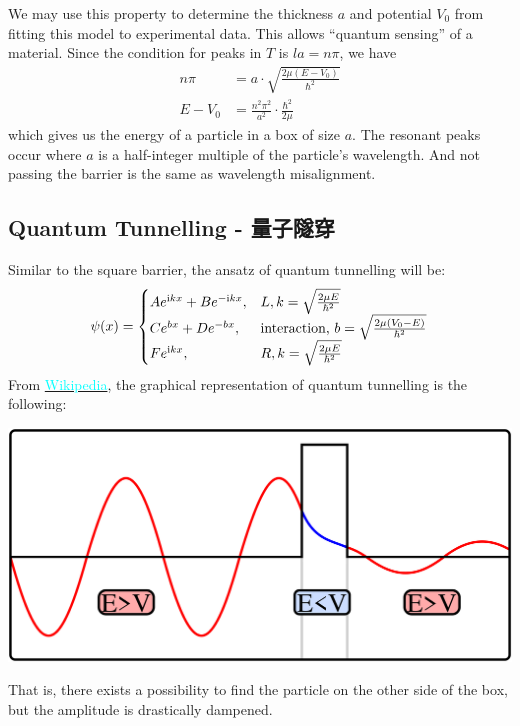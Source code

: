 We may use this property to determine the thickness $a$ and potential $V_0$ from fitting this model to experimental data. This allows ``quantum sensing'' of a material. Since the condition for peaks in $T$ is $la = n\pi$, we have
\begin{align*}
    n\pi &= a \cdot \sqrt{\frac{2\mu(E - V_0)}{\hbar^2}} \\
    E - V_0 &= \frac{n^2 \pi^2}{a^2} \cdot \frac{\hbar^2}{2\mu}
\end{align*}
which gives us the energy of a particle in a box of size $a$. The resonant peaks occur where $a$ is a half-integer multiple of the particle's wavelength. And not passing the barrier is the same as wavelength misalignment.

\subsection{Quantum Tunnelling - 量子隧穿}
Similar to the square barrier, the ansatz of quantum tunnelling will be:
$$\psi(x) = \begin{cases}
    Ae^{\mathrm{i} k x} + Be^{-\mathrm{i} k x}, & L, k = \sqrt{\frac{2\mu E}{\hbar^2}} \\
    Ce^{b x} + De^{-b x}, & \text{interaction, } b = \sqrt{\frac{2\mu(V_0 - E)}{\hbar^2}} \\
    Fe^{\mathrm{i} k x}, & R, k = \sqrt{\frac{2\mu E}{\hbar^2}}
\end{cases}$$
From \href{https://en.wikipedia.org/wiki/Quantum_tunnelling}{\textcolor{cyan}{Wikipedia}}, the graphical representation of quantum tunnelling is the following:
\begin{center}
    \includegraphics[scale = 0.2]{quantum-tunnelling.png}
\end{center}
That is, there exists a possibility to find the particle on the other side of the box, but the amplitude is drastically dampened.

\newpage